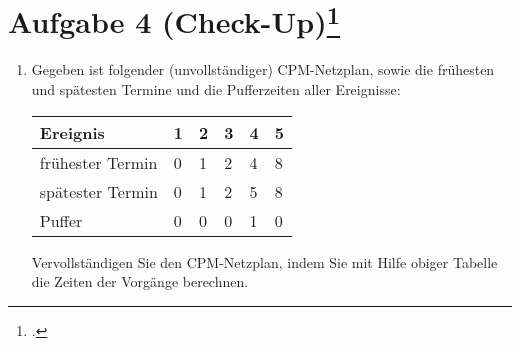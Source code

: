 \documentclass{lehramt-informatik}
\begin{document}
%

\section{Aufgabe 4 (Check-Up)\footcite[Seite 2]{sosy:ab:5}}

\begin{enumerate}


\item Gegeben ist folgender (unvollständiger) CPM-Netzplan, sowie die
frühesten und spätesten Termine und die Pufferzeiten aller Ereignisse:

\begin{minipage}{4cm}
\end{minipage}
%
\begin{minipage}{5cm}
\begin{tabular}{|l|l|l|l|l|l|}
\hline
Ereignis         & 1 & 2 & 3 & 4 & 5 \\\hline\hline
frühester Termin & 0 & 1 & 2 & 4 & 8 \\\hline
spätester Termin & 0 & 1 & 2 & 5 & 8 \\\hline
Puffer           & 0 & 0 & 0 & 1 & 0 \\\hline
\end{tabular}
\end{minipage}

Vervollständigen Sie den CPM-Netzplan, indem Sie mit Hilfe obiger
Tabelle die Zeiten der Vorgänge berechnen.

\begin{antwort}


\end{antwort}
\end{enumerate}
\end{document}
